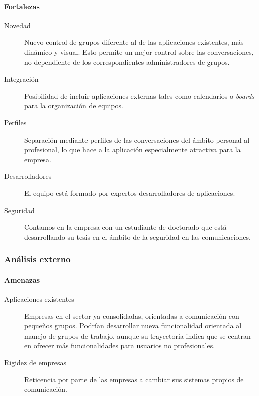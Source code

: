 \documentclass[11pt,leqno]{article}
\begin{document}
\paragraph{Fortalezas}
\begin{description}
	\item[Novedad] Nuevo control de grupos diferente al de las aplicaciones 
	existentes, más dinámico y visual. Esto permite un mejor control sobre las 
	conversaciones, no dependiente de los correspondientes administradores
	de grupos.
	\item[Integración] Posibilidad de incluir aplicaciones externas tales como
	calendarios o \textit{boards} para la organización de equipos.
	\item[Perfiles] Separación mediante perfiles de las conversaciones
	del ámbito personal al profesional, 
	lo que hace a la aplicación especialmente atractiva para la empresa.
	\item[Desarrolladores] El equipo está formado por expertos desarrolladores
	de aplicaciones. 
	\item[Seguridad] Contamos en la empresa con un estudiante de doctorado
	que está desarrollando su tesis en el ámbito de la seguridad en las 
	comunicaciones.
\end{description}	
	
\subsubsection{Análisis externo}
	
\paragraph{Amenazas}

\begin{description}
	 \item[Aplicaciones existentes] Empresas en el sector ya consolidadas, 
	 orientadas a comunicación con pequeños grupos. Podrían desarrollar nueva 
	 funcionalidad orientada al manejo de grupos de trabajo, aunque su trayectoria
	 indica que se centran en ofrecer más funcionalidades para usuarios
	 no profesionales. 

	 \item[Rigidez de empresas] Reticencia por parte de las empresas a cambiar
	 sus sistemas propios de comunicación. 

\end{description}
	
\end{document}
